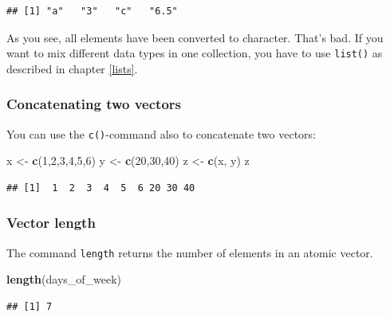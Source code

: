 \documentclass[
]{scrartcl}
\newenvironment{Shaded}{\begin{snugshade}}{\end{snugshade}}
\newcommand{\DecValTok}[1]{\textcolor[rgb]{0.00,0.00,0.81}{#1}}
\newcommand{\FunctionTok}[1]{\textcolor[rgb]{0.13,0.29,0.53}{\textbf{#1}}}
\newcommand{\NormalTok}[1]{#1}
\newcommand{\OtherTok}[1]{\textcolor[rgb]{0.56,0.35,0.01}{#1}}
\begin{document}
\begin{verbatim}
## [1] "a"   "3"   "c"   "6.5"
\end{verbatim}

As you see, all elements have been converted to character. That's bad. If you want to mix different data types in one collection, you have to use \texttt{list()} as described in chapter \ref{lists}.

\subsubsection*{Concatenating two vectors}\label{concatenating-two-vectors}

You can use the \texttt{c()}-command also to concatenate two vectors:

\begin{Shaded}
\begin{Highlighting}[]
\NormalTok{x }\OtherTok{\textless{}{-}} \FunctionTok{c}\NormalTok{(}\DecValTok{1}\NormalTok{,}\DecValTok{2}\NormalTok{,}\DecValTok{3}\NormalTok{,}\DecValTok{4}\NormalTok{,}\DecValTok{5}\NormalTok{,}\DecValTok{6}\NormalTok{)}
\NormalTok{y }\OtherTok{\textless{}{-}} \FunctionTok{c}\NormalTok{(}\DecValTok{20}\NormalTok{,}\DecValTok{30}\NormalTok{,}\DecValTok{40}\NormalTok{)}
\NormalTok{z }\OtherTok{\textless{}{-}} \FunctionTok{c}\NormalTok{(x, y)}
\NormalTok{z}
\end{Highlighting}
\end{Shaded}

\begin{verbatim}
## [1]  1  2  3  4  5  6 20 30 40
\end{verbatim}

\subsubsection*{Vector length}\label{vector-length}

The command \texttt{length} returns the number of elements in an atomic vector.

\begin{Shaded}
\begin{Highlighting}[]
\FunctionTok{length}\NormalTok{(days\_of\_week)}
\end{Highlighting}
\end{Shaded}

\begin{verbatim}
## [1] 7
\end{verbatim}
\end{document}
